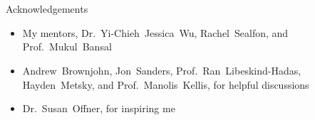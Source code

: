 \documentclass{beamer}
\let\oldsection\section
\renewcommand{\section}[1]{\oldsection{\textsc{#1}}\subsection{}}
\begin{document}
\oldsection{}

\begin{frame}{Acknowledgements}

\begin{itemize}

\item My mentors, Dr.~Yi-Chieh~Jessica~Wu, Rachel~Sealfon, and Prof.~Mukul~Bansal

\item Andrew~Brownjohn, Jon~Sanders, Prof.~Ran~Libeskind-Hadas, Hayden~Metsky, and Prof.~Manolis~Kellis, for helpful discussions

\item Dr.~Susan~Offner, for inspiring me

\end{itemize}

\end{frame}

\oldsection{}
\end{document}
